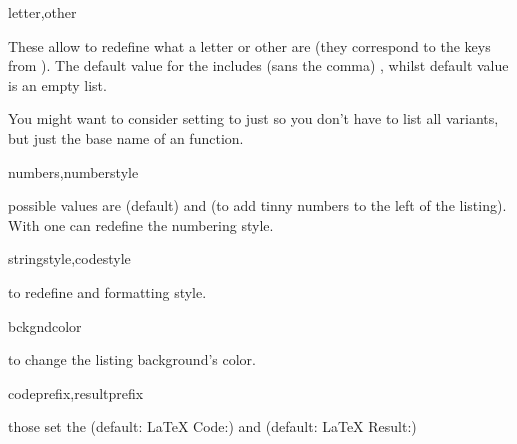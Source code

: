 \documentclass{article}
\begin{document}
\begin{codedescribe}[key,new=2025-05-13]{letter,other}
\begin{codesyntax} %
\end{codesyntax}
These allow to redefine what a letter or other are (they correspond to the  keys from ). The default value for the  includes (sans the comma)  , whilst  default value is an empty list.\\
\end{codedescribe}
\begin{tsremark}
  You might want to consider setting  to just  so you don't have to list all variants, but just the base name of an  function.
\end{tsremark}

\begin{codedescribe}[key]{numbers,numberstyle}
\begin{codesyntax} %
\end{codesyntax}
 possible values are  (default) and  (to add tinny numbers to the left of the listing). With  one can redefine the numbering style.\\
\end{codedescribe}

\begin{codedescribe}[key]{stringstyle,codestyle}
\begin{codesyntax} %
\end{codesyntax}
to redefine  and  formatting style.\\
\end{codedescribe}

\begin{codedescribe}[key]{bckgndcolor}
\begin{codesyntax} %
\end{codesyntax}
to change the listing background's color.\\
\end{codedescribe}

\begin{codedescribe}[key]{codeprefix,resultprefix}
\begin{codesyntax} %
\end{codesyntax}
those set the  (default: \LaTeX{} Code:) and  (default: \LaTeX{} Result:)
\end{codedescribe}
\end{document}
